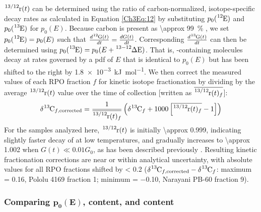 $\ce{^{13/12}r}(t)$ can be determined using the ratio of carbon-normalized, isotope-specific decay rates as calculated in Equation \ref{Ch3Eq:12} by substituting $p_{0}(\ce{^{12}E})$ and $p_{0}(\ce{^{13}E})$ for $p_{0}(E)$. Because carbon is present as \SI{\approx 99}{\%} , we set $p_{0}(\ce{^{12}E}) = p_{0}(E)$ such that $\frac{d \ce{^{12}G}(t)}{dt} = \frac{dG(t)}{dt}$. Corresponding $\frac{d \ce{^{13}G}(t)}{dt}$ can then be determined using $p_{0}(\ce{^{13}E}) = p_{0}(E + \ce{^{13-12}\Delta E})$. That is, -containing molecules decay at rates governed by a pdf of $E$ that is identical to $p_{0}(E)$ but has been shifted to the right by \SI{1.8e-3}{kJ.mol^{-1}}. We then correct the measured  values of each RPO fraction $f$ for kinetic isotope fractionation by dividing by the average $\ce{^{13/12}r}(t)$ value over the time of collection [written as $\mean{\ce{^{13/12}r}(t)_{f}}$]:
%
\begin{equation}\label{Ch3Eq:26}
	\ce{\delta^{13}C}_{f, \text{corrected}} = \frac{1}{\mean{\ce{^{13/12}r}(t)_{f}}} \left( \ce{\delta^{13}C}_{f} + 1000 \left[ \mean{\ce{^{13/12}r}(t)_{f}} - 1 \right] \right)
\end{equation}
%
For the samples analyzed here,  $\ce{^{13/12}r}(t)$ is initially \num{\approx 0.999}, indicating slightly faster decay of  at low temperatures, and gradually increases to \num{\approx 1.002} when $G(t) \ll 0.01 G_{0}$,  as has been described previously \citep{Cramer:2004tg,Hemingway:2016rc}. Resulting kinetic fractionation corrections are near or within analytical uncertainty, with absolute  values for all RPO fractions shifted by \SI{< 0.2}{\permil} ($\ce{\delta^{13}C}_{f, \text{corrected}} - \ce{\delta^{13}C}_{f}$: maximum = \SI{+0.16}{\permil}, Pololu 4169 fraction 1; minimum = \SI{-0.10}{\permil}, Narayani PB-60 fraction 9).

\subsubsection{Comparing $\bm{p_{0}(E)}$,  content, and  content}

